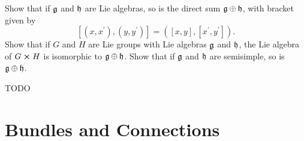 \documentclass[10pt]{article}
\begin{document}
\begin{example}
	Show that if $\mathfrak{g}$ and $\mathfrak{h}$ are Lie algebras, so is the direct sum $\mathfrak{g} \oplus \mathfrak{h}$, with bracket given by
	$$
	[(x,x^\prime),(y,y^\prime)] = ([x,y],[x^\prime,y^\prime]).
	$$
	Show that if $G$ and $H$ are Lie groups with Lie algebras $\mathfrak{g}$ and $\mathfrak{h}$, the Lie algebra of $G \cross H$ is isomorphic to $\mathfrak{g} \oplus \mathfrak{h}$. Show that if $\mathfrak{g}$ and $\mathfrak{h}$ are semisimple, so is $\mathfrak{g} \oplus \mathfrak{h}$.
\end{example}
\sol TODO



\newpage
\section{Bundles and Connections}\label{b2c2}
\end{document}
